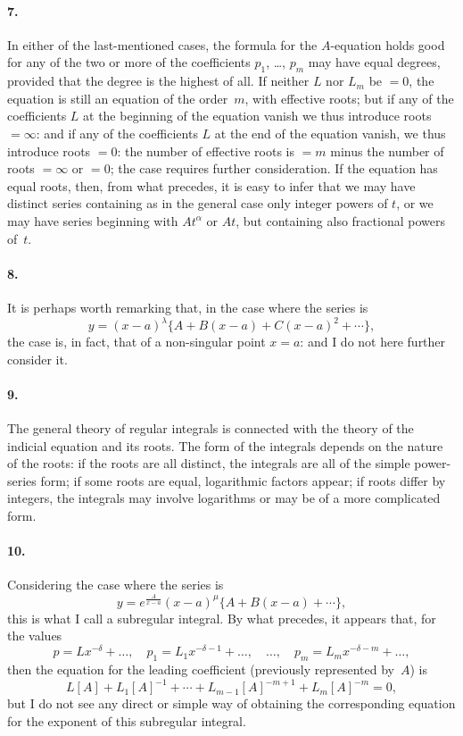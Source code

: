 \documentclass[11pt,a4paper]{article}
\theoremstyle{definition}
\begin{document}
\paragraph{7.} In either of the last-mentioned cases, the formula for the $A$-equation holds good for any of the two or more of the coefficients $p_{1}$, \ldots, $p_{m}$ may have equal degrees, provided that the degree is the highest of all. If neither $L$ nor $L_{m}$ be $=0$, the equation is still an equation of the order~$m$, with effective roots; but if any of the coefficients $L$ at the beginning of the equation vanish we thus introduce roots $= \infty$: and if any of the coefficients $L$ at the end of the equation vanish, we thus introduce roots $= 0$: the number of effective roots is $= m$ minus the number of roots $= \infty$ or $=0$; the case requires further consideration. If the equation has equal roots, then, from what precedes, it is easy to infer that we may have distinct series containing as in the general case only integer powers of $t$, or we may have series beginning with $At^{\alpha}$ or $At$, but containing also fractional powers of~$t$.

\paragraph{8.} It is perhaps worth remarking that, in the case where the series is
\[
y = (x - a)^{\lambda}\{A + B(x - a) + C(x - a)^{2} + \cdots\},
\]
the case is, in fact, that of a non-singular point $x = a$: and I do not here further consider it.

\paragraph{9.} The general theory of regular integrals is connected with the theory of the indicial equation and its roots. The form of the integrals depends on the nature of the roots: if the roots are all distinct, the integrals are all of the simple power-series form; if some roots are equal, logarithmic factors appear; if roots differ by integers, the integrals may involve logarithms or may be of a more complicated form.

\paragraph{10.} Considering the case where the series is
\[
y = e^{\frac{A}{x-a}}(x - a)^{\mu}\{A + B(x - a) + \cdots\},
\]
this is what I call a subregular integral. By what precedes, it appears that, for the values
\[
p = Lx^{-\delta} + \ldots, \quad p_{1} = L_{1}x^{-\delta-1} + \ldots, \quad \ldots, \quad p_{m} = L_{m}x^{-\delta-m} + \ldots,
\]
then the equation for the leading coefficient (previously represented by~$A$) is
\[
L[A] + L_{1}[A]^{-1} + \cdots + L_{m-1}[A]^{-m+1} + L_{m}[A]^{-m} = 0,
\]
but I do not see any direct or simple way of obtaining the corresponding equation for the exponent of this subregular integral.
\end{document}
